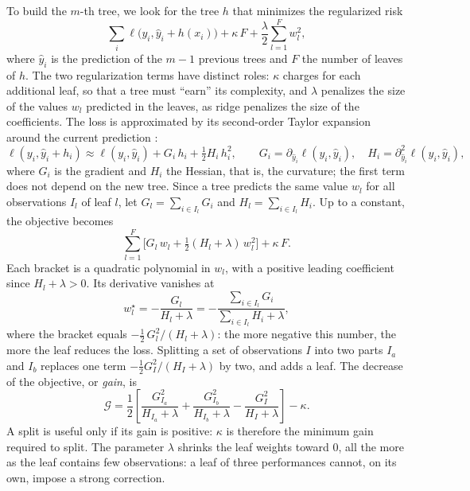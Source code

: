 \documentclass[11pt,a4paper]{article}
\begin{document}
To build the $m$-th tree, we look for the tree $h$ that minimizes the regularized risk
\[
\sum_i \ell\big(y_i, \hat y_i + h(x_i)\big) + \kappa\,F + \frac{\lambda}{2}\sum_{l=1}^F w_l^2,
\]
where $\hat y_i$ is the prediction of the $m - 1$ previous trees and $F$ the number of leaves of $h$. The two
regularization terms have distinct roles: $\kappa$ charges for each additional leaf, so that a tree must ``earn'' its
complexity, and $\lambda$ penalizes the size of the values $w_l$ predicted in the leaves, as ridge penalizes the size of
the coefficients. The loss is approximated by its second-order Taylor expansion around the current prediction
\citep{chen2016}:
\[
\ell(y_i, \hat y_i + h_i) \approx \ell(y_i, \hat y_i) + G_i\,h_i + \tfrac12 H_i\,h_i^2,
\qquad G_i = \partial_{\hat y_i}\ell(y_i, \hat y_i),\quad H_i = \partial^2_{\hat y_i}\ell(y_i, \hat y_i),
\]
where $G_i$ is the gradient and $H_i$ the Hessian, that is, the curvature; the first term does not depend on the new
tree. Since a tree predicts the same value $w_l$ for all observations $I_l$ of leaf $l$, let
$G_l = \sum_{i \in I_l} G_i$ and $H_l = \sum_{i \in I_l} H_i$. Up to a constant, the objective becomes
\[
\sum_{l=1}^F \Big[G_l\,w_l + \tfrac12 (H_l + \lambda)\,w_l^2\Big] + \kappa\,F .
\]
Each bracket is a quadratic polynomial in $w_l$, with a positive leading coefficient since $H_l + \lambda > 0$. Its
derivative vanishes at
\begin{equation}\label{eq:leaf_weight}
w_l^\star = -\frac{G_l}{H_l + \lambda} = -\frac{\sum_{i\in I_l} G_i}{\sum_{i\in I_l} H_i + \lambda},
\end{equation}
where the bracket equals $-\frac12\,G_l^2/(H_l + \lambda)$: the more negative this number, the more the leaf reduces
the loss. Splitting a set of observations $I$ into two parts $I_a$ and $I_b$ replaces one term
$-\frac12 G_I^2/(H_I + \lambda)$ by two, and adds a leaf. The decrease of the objective, or \emph{gain}, is
\begin{equation}\label{eq:gain}
\mathcal G = \frac12\left[\frac{G_{I_a}^2}{H_{I_a} + \lambda} + \frac{G_{I_b}^2}{H_{I_b} + \lambda}
- \frac{G_{I}^2}{H_{I} + \lambda}\right] - \kappa .
\end{equation}
A split is useful only if its gain is positive: $\kappa$ is therefore the minimum gain required to split. The parameter
$\lambda$ shrinks the leaf weights toward 0, all the more as the leaf contains few observations: a leaf of three
performances cannot, on its own, impose a strong correction.
\end{document}
